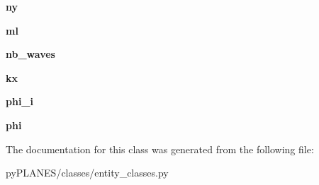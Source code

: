 \begin{DoxyCompactItemize}
\mbox{\label{classpy_p_l_a_n_e_s_1_1classes_1_1entity__classes_1_1_pw_fem_ac103cd80a883cf95d51353e51b05bfa3}} 
{\bfseries ny}
\item 
\mbox{\label{classpy_p_l_a_n_e_s_1_1classes_1_1entity__classes_1_1_pw_fem_a86408b39d1c03be2c3db6b00d273fa18}} 
{\bfseries ml}
\item 
\mbox{\label{classpy_p_l_a_n_e_s_1_1classes_1_1entity__classes_1_1_pw_fem_abc22b938ff29b63f895489cb876595c3}} 
{\bfseries nb\+\_\+waves}
\item 
\mbox{\label{classpy_p_l_a_n_e_s_1_1classes_1_1entity__classes_1_1_pw_fem_a2ad23c4a150e07fac41af577bdd10315}} 
{\bfseries kx}
\item 
\mbox{\label{classpy_p_l_a_n_e_s_1_1classes_1_1entity__classes_1_1_pw_fem_a703dc5b433d331858f5516c980334fe9}} 
{\bfseries phi\+\_\+i}
\item 
\mbox{\label{classpy_p_l_a_n_e_s_1_1classes_1_1entity__classes_1_1_pw_fem_a6f8596fe571dc0e3702ca5af011fba1b}} 
{\bfseries phi}
\end{DoxyCompactItemize}


The documentation for this class was generated from the following file\+:\begin{DoxyCompactItemize}
\item 
py\+P\+L\+A\+N\+E\+S/classes/entity\+\_\+classes.\+py\end{DoxyCompactItemize}
